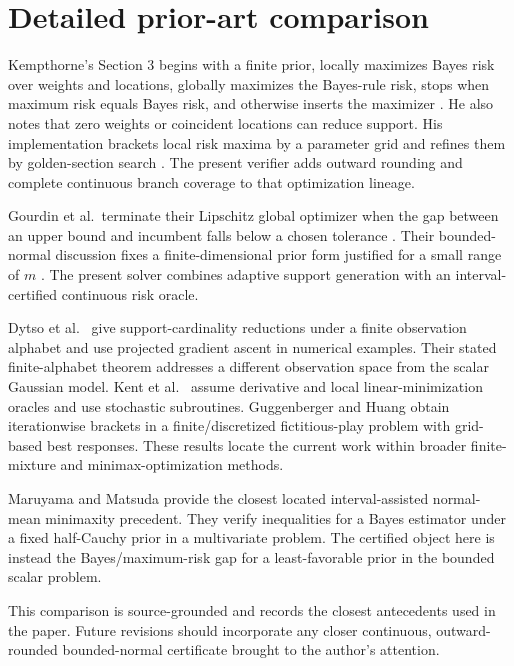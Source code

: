 \section{Detailed prior-art comparison}
\label{app:lineage}

Kempthorne's Section 3 begins with a finite prior, locally maximizes Bayes risk
over weights and locations, globally maximizes the Bayes-rule risk, stops when
maximum risk equals Bayes risk, and otherwise inserts the maximizer
\cite[pp.~175--177]{kempthorne1987}.  He also notes that zero weights or
coincident locations can reduce support.  His implementation brackets local
risk maxima by a parameter grid and refines them by golden-section search
\cite[p.~177]{kempthorne1987}.  The present verifier adds outward rounding
and complete continuous branch coverage to that optimization lineage.

Gourdin et al.\ terminate their Lipschitz global optimizer when the gap
between an upper bound and incumbent falls below a chosen tolerance
\cite[pp.~19--21]{gourdin1994}.  Their bounded-normal discussion fixes a
finite-dimensional prior form justified for a small range of $m$
\cite[pp.~25--26]{gourdin1994}.  The present solver combines adaptive support
generation with an interval-certified continuous risk oracle.

Dytso et al.\ \cite{dytso2022} give support-cardinality reductions under a
finite observation alphabet and use projected gradient ascent in numerical
examples.  Their stated finite-alphabet theorem addresses a different
observation space from the scalar Gaussian model.  Kent et al.\
\cite{kent2021} assume derivative and local linear-minimization oracles and
use stochastic subroutines.  Guggenberger and Huang
\cite{guggenberger2025} obtain iterationwise brackets in a
finite/discretized fictitious-play problem with grid-based best responses.
These results locate the current work within broader finite-mixture and
minimax-optimization methods.

Maruyama and Matsuda \cite{maruyama2025} provide the closest located
interval-assisted normal-mean minimaxity precedent.  They verify inequalities
for a Bayes estimator under a fixed half-Cauchy prior in a multivariate
problem.  The certified object here is instead the Bayes/maximum-risk gap for
a least-favorable prior in the bounded scalar problem.

This comparison is source-grounded and records the closest antecedents used in
the paper.  Future revisions should incorporate any closer continuous,
outward-rounded bounded-normal certificate brought to the author's attention.
